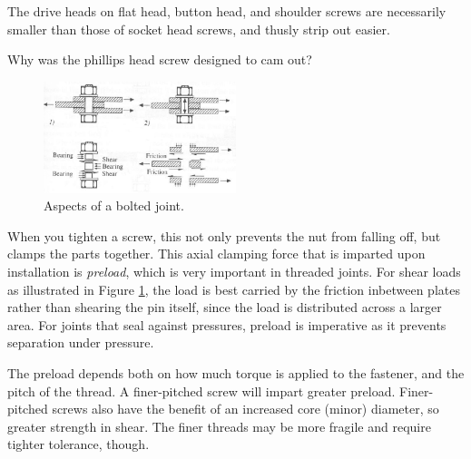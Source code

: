	The drive heads on flat head, button head, and shoulder screws are necessarily smaller than those of socket head screws, and thusly strip out easier.

\addvspace{2.0ex}
	\begin{qbox}
		Why was the phillips head screw designed to cam out?
	\end{qbox}
	
	\begin{figure}[H]
		\includegraphics[width=0.5\textwidth]{imgs/bolt_preload.png}
		\caption{Aspects of a bolted joint.}
		 \label{fig:bolted_joint} 
	\end{figure}
	
	When you tighten a screw, this not only prevents the nut from falling off, but clamps the parts together. This axial clamping force that is imparted upon installation is \textit{preload}, which is very important in threaded joints. For shear loads as illustrated in Figure \ref{fig:bolted_joint}, the load is best carried by the friction inbetween plates rather than shearing the pin itself, since the load is distributed across a larger area. For joints that seal against pressures, preload is imperative as it prevents separation under pressure.
	
	The preload depends both on how much torque is applied to the fastener, and the pitch of the thread. A finer-pitched screw will impart greater preload. Finer-pitched screws also have the benefit of an increased core (minor) diameter, so greater strength in shear. The finer threads may be more fragile and require tighter tolerance, though.
	
